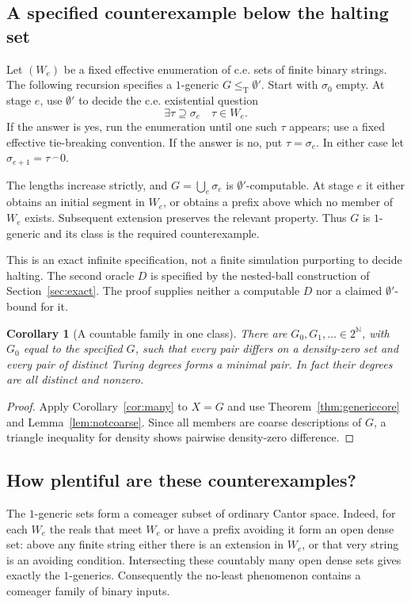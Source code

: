 \documentclass[11pt,a4paper]{article}
\newcommand{\N}{\mathbb N}
\newcommand{\Cantor}{2^{\N}}
\newcommand{\leT}{\leq_{\mathrm T}}
\newtheorem{corollary}[theorem]{Corollary}
\theoremstyle{definition}\newtheorem{definition}[theorem]{Definition}
\theoremstyle{remark}\newtheorem{remark}[theorem]{Remark}
\begin{document}
\subsection{A specified counterexample below the halting set}
\label{sec:explicit}
Let $(W_e)$ be a fixed effective enumeration of c.e. sets of finite binary strings. The following recursion specifies a $1$-generic $G\leT\emptyset'$. Start with $\sigma_0$ empty. At stage $e$, use $\emptyset'$ to decide the c.e. existential question
\[
                   \exists\tau\supseteq\sigma_e\quad\tau\in W_e.
\]
If the answer is yes, run the enumeration until one such $\tau$ appears; use a fixed effective tie-breaking convention. If the answer is no, put $\tau=\sigma_e$. In either case let $\sigma_{e+1}=\tau\,^{\frown}0$.

The lengths increase strictly, and $G=\bigcup_e\sigma_e$ is $\emptyset'$-computable. At stage $e$ it either obtains an initial segment in $W_e$, or obtains a prefix above which no member of $W_e$ exists. Subsequent extension preserves the relevant property. Thus $G$ is $1$-generic and its class is the required counterexample.

This is an exact infinite specification, not a finite simulation purporting to decide halting. The second oracle $D$ is specified by the nested-ball construction of Section~\ref{sec:exact}. The proof supplies neither a computable $D$ nor a claimed $\emptyset'$-bound for it.

\begin{corollary}[A countable family in one class]\label{cor:genericfamily}
There are $G_0,G_1,\ldots\in\Cantor$, with $G_0$ equal to the specified $G$, such that every pair differs on a density-zero set and every pair of distinct Turing degrees forms a minimal pair. In fact their degrees are all distinct and nonzero.
\end{corollary}
\begin{proof}
Apply Corollary~\ref{cor:many} to $X=G$ and use Theorem~\ref{thm:genericcore} and Lemma~\ref{lem:notcoarse}. Since all members are coarse descriptions of $G$, a triangle inequality for density shows pairwise density-zero difference.
\end{proof}

\subsection{How plentiful are these counterexamples?}
The $1$-generic sets form a comeager subset of ordinary Cantor space. Indeed, for each $W_e$ the reals that meet $W_e$ or have a prefix avoiding it form an open dense set: above any finite string either there is an extension in $W_e$, or that very string is an avoiding condition. Intersecting these countably many open dense sets gives exactly the $1$-generics. Consequently the no-least phenomenon contains a comeager family of binary inputs.
\end{document}
